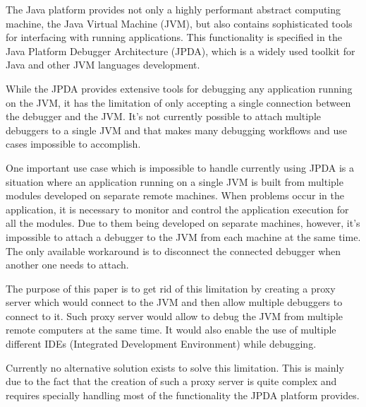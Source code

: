 \documentclass[..thesis.tex]{subfiles}
\begin{document}
% 
% 

The Java platform provides not only a highly performant abstract computing machine, the Java Virtual Machine (JVM), but also contains sophisticated tools for interfacing with running applications. 
This functionality is specified in the Java Platform Debugger Architecture (JPDA), which is a widely used toolkit for Java and other JVM languages development.

While the JPDA provides extensive tools for debugging any application running on the JVM, it has the limitation of only accepting a single connection between the debugger and the JVM. 
It's not currently possible to attach multiple debuggers to a single JVM and that makes many debugging workflows and use cases impossible to accomplish.

One important use case which is impossible to handle currently using JPDA is a situation where an application running on a single JVM is built from multiple modules developed on separate remote machines.
When problems occur in the application, it is necessary to monitor and control the application execution for all the modules.
Due to them being developed on separate machines, however, it's impossible to attach a debugger to the JVM from each machine at the same time. 
The only available workaround is to disconnect the connected debugger when another one needs to attach.

The purpose of this paper is to get rid of this limitation by creating a proxy server which would connect to the JVM and then allow multiple debuggers to connect to it. 
Such proxy server would allow to debug the JVM from multiple remote computers at the same time.  
It would also enable the use of multiple different IDEs (Integrated Development Environment) while debugging. 

Currently no alternative solution exists to solve this limitation.
This is mainly due to the fact that the creation of such a proxy server is quite complex and requires specially handling most of the functionality the JPDA platform provides.
\end{document}
